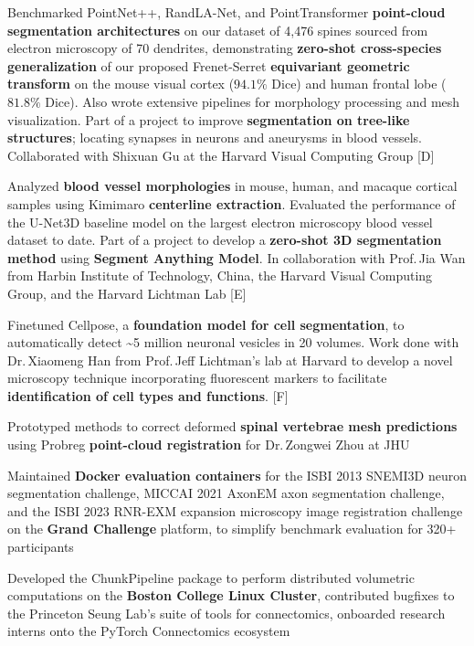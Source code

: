 \documentclass[letterpaper,11pt]{article}
\newcommand{\resumeItem}[1]{
  \item\small{
    {#1 \vspace{-2pt}}
  }
}
\begin{document}
        \resumeItem{\hypertarget{freseg_back}{Benchmarked PointNet++, RandLA-Net, and PointTransformer \textbf{point-cloud segmentation architectures} on our dataset of 4,476 spines sourced from electron microscopy of 70 dendrites, demonstrating \textbf{zero-shot cross-species generalization} of our proposed Frenet-Serret \textbf{equivariant geometric transform} on the mouse visual cortex ($94.1\%$ Dice) and human frontal lobe ($81.8\%$ Dice). Also wrote extensive pipelines for morphology processing and mesh visualization. Part of a project to improve \textbf{segmentation on tree-like structures}; locating synapses in neurons and aneurysms in blood vessels. Collaborated with Shixuan Gu at the Harvard Visual Computing Group {[D]}}}
      
        \resumeItem{\hypertarget{trisam_back}{Analyzed \textbf{blood vessel morphologies} in mouse, human, and macaque cortical samples using Kimimaro \textbf{centerline extraction}. Evaluated the performance of the U-Net3D baseline model on the largest electron microscopy blood vessel dataset to date. Part of a project to develop a \textbf{zero-shot 3D segmentation method} using \textbf{Segment Anything Model}. In collaboration with Prof.\,Jia Wan from Harbin Institute of Technology, China, the Harvard Visual Computing Group, and the Harvard Lichtman Lab {[E]}}}
      
        \resumeItem{\hypertarget{xiaomeng_back}{Finetuned Cellpose, a \textbf{{foundation model for cell segmentation}}, to automatically detect \textasciitilde{}5 million neuronal vesicles in 20 volumes. Work done with Dr.\,Xiaomeng Han from Prof.\,Jeff Lichtman’s lab at Harvard to develop a novel microscopy technique incorporating fluorescent markers to facilitate \textbf{identification of cell types and functions}. {[F]}}}
      
        \resumeItem{Prototyped methods to correct deformed \textbf{spinal vertebrae mesh predictions} using Probreg \textbf{point-cloud registration} for Dr.\,Zongwei Zhou at JHU}
      
        \resumeItem{Maintained \textbf{Docker evaluation containers} for the ISBI 2013 SNEMI3D neuron segmentation challenge, MICCAI 2021 AxonEM axon segmentation challenge, and the ISBI 2023 RNR-EXM expansion microscopy image registration challenge on the \textbf{Grand Challenge} platform, to simplify benchmark evaluation for 320+ participants}
      
        \resumeItem{Developed the ChunkPipeline package to perform distributed volumetric computations on the \textbf{Boston College Linux Cluster}, contributed bugfixes to the Princeton Seung Lab's suite of tools for connectomics, onboarded research interns onto the PyTorch Connectomics ecosystem}
      
\end{document}
